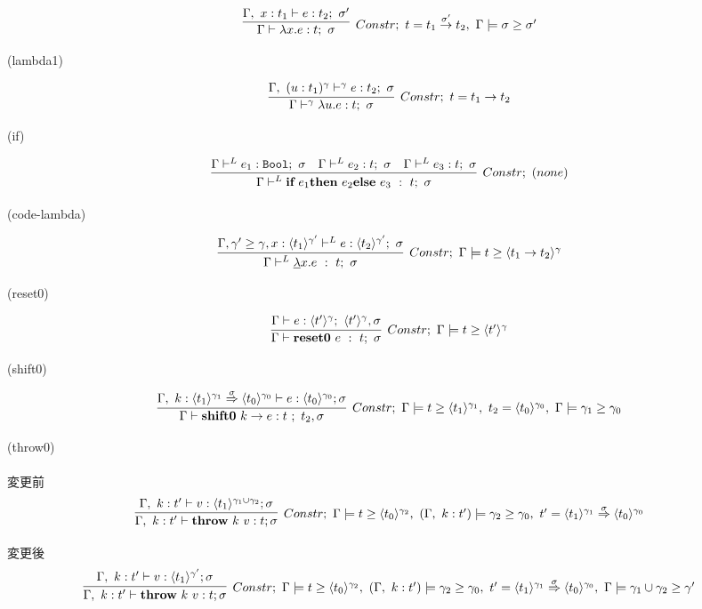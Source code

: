 \documentclass[dvipdfmx]{jsarticle}
\newcommand\longer[2]{{#1} \ord {#2}}
\newcommand\Bool{\mbox{\texttt{Bool}}}
\newcommand\uni{\cup} %
\begin{document}
\[
  \infer[Constr;~t=\funT{t_1}{t_2}{\sigma'},~ \Gamma \models \sigma \ord \sigma' ]
  {\Gamma \vdash \lambda x.e : t;~\sigma}
  {\Gamma,~x:t_1 \vdash e : t_2;~\sigma'}
\]

(lambda1) \\

\[
  \infer[Constr;~t=\funT{t_1}{t_2}{}]
  {\Gamma \vdash^\gamma \lambda u.e : t;~\sigma}
  {\Gamma,~(u:t_1)^\gamma \vdash^\gamma e : t_2;~\sigma}
\]

(if)

\[
  \infer[Constr;~(none)]
  {\Gamma \vdash^L
    \textbf{if}~e_1 \textbf{then}~e_2 \textbf{else}~e_3 ~:~t; ~ \sigma}
  {\Gamma \vdash^L e_1 : \Bool;~\sigma
    &\Gamma \vdash^L e_2 : t;~\sigma
    &\Gamma \vdash^L e_3 : t;~\sigma
  }
\]

(code-lambda)

\[
  \infer[Constr;~\Gamma \models \longer{t}{\codeT{t_1 \to t_2}{\gamma}}]
  {\Gamma \vdash^L \underline{\lambda}x.e ~:~t;~\sigma}
  {\Gamma,\longer{\gamma'}{\gamma},x:\codeT{t_1}{\gamma'}
    \vdash^L e : \codeT{t_2}{\gamma'};~\sigma
  }
\]

(reset0)

\[
  \infer[Constr;~\Gamma \models \longer{t}{\codeT{t'}{\gamma}}]
  {\Gamma \vdash \Resetz~e ~:~ t; ~\sigma}
  {\Gamma \vdash e:\codeT{t'}{\gamma};~\codeT{t'}{\gamma},\sigma
  }
\]

(shift0)

\[
  \infer[Constr;~\Gamma \models \longer{t}{\codeT{t_1}{\gamma_1}},~ t_2 =\codeT{t_0}{\gamma_0},~ \Gamma \models \longer{\gamma_1}{\gamma_0}]
  {\Gamma \vdash \shiftz{k}{e} : t~;~ t_2,\sigma}
  {\Gamma,~k:\contT{\codeT{t_1}{\gamma_1}}{\codeT{t_0}{\gamma_0}}{\sigma}
    \vdash e : \codeT{t_0}{\gamma_0} ; \sigma
  }
\]


(throw0)\\
\\
変更前
\[
  \infer[Constr;~ \Gamma \models \longer{t}{\codeT{t_0}{\gamma_2}},~ (\Gamma,~ k:t') \models \gamma_2 \ord \gamma_0,~  t' = \contT{\codeT{t_1}{\gamma_1}}{\codeT{t_0}{\gamma_0}}{\sigma}]
  {\Gamma,~ k:t'
    \vdash \throw{k}{v} : t ; \sigma}
  {\Gamma,~ k:t'
    \vdash v : \codeT{t_1}{\gamma_1 \uni \gamma_2} ; \sigma
  }
\]

変更後
\[
  \infer[Constr;~ \Gamma \models \longer{t}{\codeT{t_0}{\gamma_2}},~ (\Gamma,~ k:t') \models \gamma_2 \ord \gamma_0,~  t' = \contT{\codeT{t_1}{\gamma_1}}{\codeT{t_0}{\gamma_0}}{\sigma},~ \Gamma \models \gamma_1 \uni \gamma_2 \ord \gamma']
  {\Gamma,~ k:t'
    \vdash \throw{k}{v} : t ; \sigma}
  {\Gamma,~ k:t'
    \vdash v : \codeT{t_1}{\gamma'} ; \sigma
  }
\]
\end{document}
